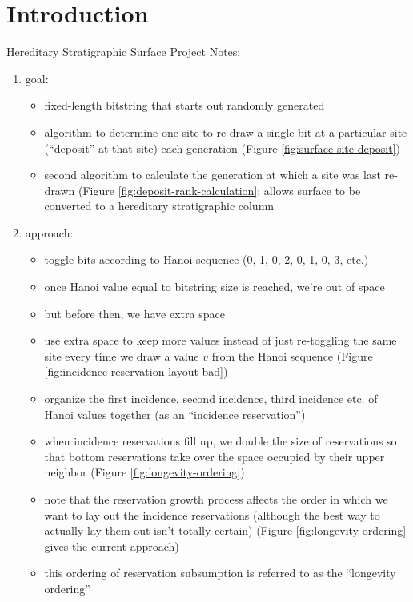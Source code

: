 \section{Introduction} \label{sec:introduction}



Hereditary Stratigraphic Surface Project Notes:

\begin{enumerate}
\item goal:
\begin{itemize}
  \item fixed-length bitstring that starts out randomly generated
  \item algorithm to determine one site to re-draw a single bit at a particular site (``deposit'' at that site) each generation (Figure \ref{fig:surface-site-deposit})
  \item second algorithm to calculate the generation at which a site was last re-drawn (Figure \ref{fig:deposit-rank-calculation}; allows surface to be converted to a hereditary stratigraphic column
\end{itemize}
\item approach:
\begin{itemize}
  \item toggle bits according to Hanoi sequence (0, 1, 0, 2, 0, 1, 0, 3, etc.)
  \item once Hanoi value equal to bitstring size is reached, we're out of space
  \item but before then, we have extra space
  \item use extra space to keep more values instead of just re-toggling the same site every time we draw a value $v$ from the Hanoi sequence (Figure \ref{fig:incidence-reservation-layout-bad})
  \item organize the first incidence, second incidence, third incidence etc. of Hanoi values together (as an ``incidence reservation'')
  \item when incidence reservations fill up, we double the size of reservations so that bottom reservations take over the space occupied by their upper neighbor (Figure \ref{fig:longevity-ordering})
  \item note that the reservation growth process affects the order in which we want to lay out the incidence reservations (although the best way to actually lay them out isn't totally certain) (Figure \ref{fig:longevity-ordering} gives the current approach)
  \item this ordering of reservation subsumption is referred to as the ``longevity ordering''

\end{itemize}
\end{enumerate}
